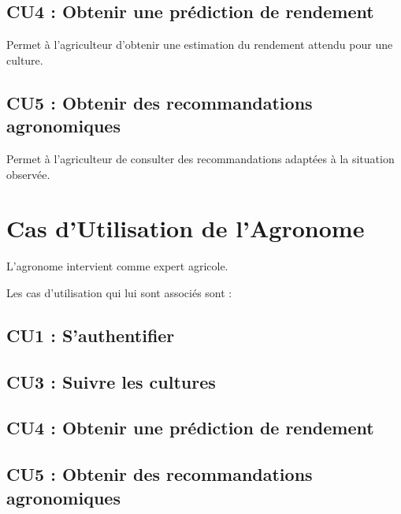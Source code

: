 \hypertarget{cu4-obtenir-une-pruxe9diction-de-rendement}{%
\subsection{CU4 : Obtenir une prédiction de
rendement}\label{cu4-obtenir-une-pruxe9diction-de-rendement}}

Permet à l'agriculteur d'obtenir une estimation du rendement attendu
pour une culture.

\hypertarget{cu5-obtenir-des-recommandations-agronomiques}{%
\subsection{CU5 : Obtenir des recommandations
agronomiques}\label{cu5-obtenir-des-recommandations-agronomiques}}

Permet à l'agriculteur de consulter des recommandations adaptées à la
situation observée.

\hypertarget{cas-dutilisation-de-lagronome}{%
\section{Cas d'Utilisation de
l'Agronome}\label{cas-dutilisation-de-lagronome}}

L'agronome intervient comme expert agricole.

Les cas d'utilisation qui lui sont associés sont :

\hypertarget{cu1-sauthentifier-1}{%
\subsection{CU1 : S'authentifier}\label{cu1-sauthentifier-1}}

\hypertarget{cu3-suivre-les-cultures-1}{%
\subsection{CU3 : Suivre les cultures}\label{cu3-suivre-les-cultures-1}}

\hypertarget{cu4-obtenir-une-pruxe9diction-de-rendement-1}{%
\subsection{CU4 : Obtenir une prédiction de
rendement}\label{cu4-obtenir-une-pruxe9diction-de-rendement-1}}

\hypertarget{cu5-obtenir-des-recommandations-agronomiques-1}{%
\subsection{CU5 : Obtenir des recommandations
agronomiques}\label{cu5-obtenir-des-recommandations-agronomiques-1}}

